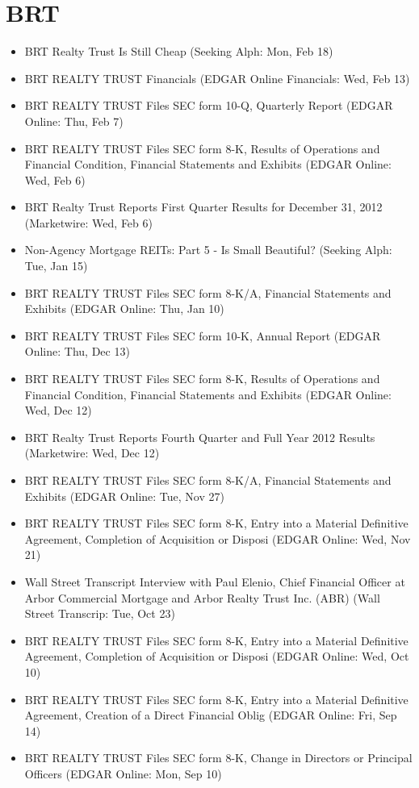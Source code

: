 \documentclass[11pt,asymmetric]{article}
\begin{document}
\section*{BRT}
\begin{itemize}
\item BRT Realty Trust Is Still Cheap (Seeking Alph: Mon, Feb 18)
\item BRT REALTY TRUST Financials (EDGAR Online Financials: Wed, Feb 13)
\item BRT REALTY TRUST Files SEC form 10-Q, Quarterly Report (EDGAR Online: Thu, Feb 7)
\item BRT REALTY TRUST Files SEC form 8-K, Results of Operations and Financial Condition, Financial Statements and Exhibits (EDGAR Online: Wed, Feb 6)
\item BRT Realty Trust Reports First Quarter Results for December 31, 2012 (Marketwire: Wed, Feb 6)
\item Non-Agency Mortgage REITs: Part 5 - Is Small Beautiful? (Seeking Alph: Tue, Jan 15)
\item BRT REALTY TRUST Files SEC form 8-K/A, Financial Statements and Exhibits (EDGAR Online: Thu, Jan 10)
\item BRT REALTY TRUST Files SEC form 10-K, Annual Report (EDGAR Online: Thu, Dec 13)
\item BRT REALTY TRUST Files SEC form 8-K, Results of Operations and Financial Condition, Financial Statements and Exhibits (EDGAR Online: Wed, Dec 12)
\item BRT Realty Trust Reports Fourth Quarter and Full Year 2012 Results (Marketwire: Wed, Dec 12)
\item BRT REALTY TRUST Files SEC form 8-K/A, Financial Statements and Exhibits (EDGAR Online: Tue, Nov 27)
\item BRT REALTY TRUST Files SEC form 8-K, Entry into a Material Definitive Agreement, Completion of Acquisition or Disposi (EDGAR Online: Wed, Nov 21)
\item Wall Street Transcript Interview with Paul Elenio, Chief Financial Officer at Arbor Commercial Mortgage and Arbor Realty Trust Inc. (ABR) (Wall Street Transcrip: Tue, Oct 23)
\item BRT REALTY TRUST Files SEC form 8-K, Entry into a Material Definitive Agreement, Completion of Acquisition or Disposi (EDGAR Online: Wed, Oct 10)
\item BRT REALTY TRUST Files SEC form 8-K, Entry into a Material Definitive Agreement, Creation of a Direct Financial Oblig (EDGAR Online: Fri, Sep 14)
\item BRT REALTY TRUST Files SEC form 8-K, Change in Directors or Principal Officers (EDGAR Online: Mon, Sep 10)

\end{itemize}
\end{document}
